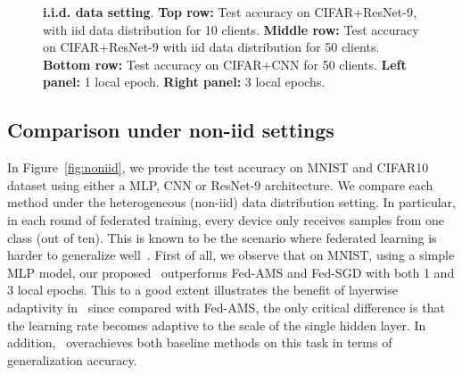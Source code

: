 \documentclass[twoside]{article}
\begin{document}
\begin{figure}[t]
\begin{center}
{         }
    \end{center}
    \vspace{0.05in}
	\caption{\textbf{i.i.d. data setting}. \textbf{Top row:} Test accuracy on CIFAR+ResNet-9, with iid data distribution for 10 clients. 
	\textbf{Middle row:} Test accuracy on CIFAR+ResNet-9 with iid data distribution for 50 clients.
	\textbf{Bottom row:} Test accuracy on CIFAR+CNN for 50 clients.
	\textbf{Left panel:} 1 local epoch. \textbf{Right panel:} 3 local epochs. 
	}
	\label{fig:iid}
	\vspace{-0.1in}
\end{figure}



\subsection{Comparison under non-iid settings}

In Figure~\ref{fig:noniid}, we provide the test accuracy on  MNIST and CIFAR10 dataset using either a MLP, CNN or ResNet-9 architecture. 
We compare each method under the heterogeneous (non-iid) data distribution setting. In particular, in each round of federated training, every device only receives samples from one class (out of ten). 
This is known to be the scenario where federated learning is harder to generalize well~\citet{mcmahan2017communication}. 
First of all, we observe that on MNIST, using a simple MLP model, our proposed \algo\ outperforms Fed-AMS and Fed-SGD with both 1 and 3 local epochs. This to a good extent illustrates the benefit of layerwise adaptivity in \algo\, since compared with Fed-AMS, the only critical difference is that the learning rate becomes adaptive to the scale of the single hidden layer. 
In addition, \algo\ overachieves both baseline methods on this task in terms of generalization accuracy. 
\end{document}
